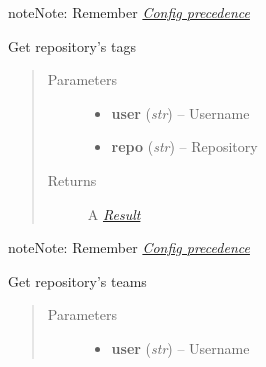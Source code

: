 \documentclass[letterpaper,10pt,english]{sphinxmanual}
\begin{document}
\begin{fulllineitems}
\begin{fulllineitems}
\begin{quote}
\begin{description}
\end{description}\end{quote}

\begin{notice}{note}{Note:}
Remember {\hyperref[repos:config-precedence]{\emph{Config precedence}}}
\end{notice}

\end{fulllineitems}


\begin{fulllineitems}
\label{repos:pygithub3.services.repos.Repo.list_tags}
Get repository's tags
\begin{quote}\begin{description}
\item[{Parameters}] \leavevmode\begin{itemize}
\item {} 
\textbf{user} (\emph{str}) -- Username

\item {} 
\textbf{repo} (\emph{str}) -- Repository

\end{itemize}

\item[{Returns}] \leavevmode
A {\hyperref[result::doc]{\emph{Result}}}

\end{description}\end{quote}

\begin{notice}{note}{Note:}
Remember {\hyperref[repos:config-precedence]{\emph{Config precedence}}}
\end{notice}

\end{fulllineitems}


\begin{fulllineitems}
\label{repos:pygithub3.services.repos.Repo.list_teams}
Get repository's teams
\begin{quote}\begin{description}
\item[{Parameters}] \leavevmode\begin{itemize}
\item {} 
\textbf{user} (\emph{str}) -- Username


\end{itemize}
\end{description}
\end{quote}
\end{fulllineitems}
\end{fulllineitems}
\end{document}
